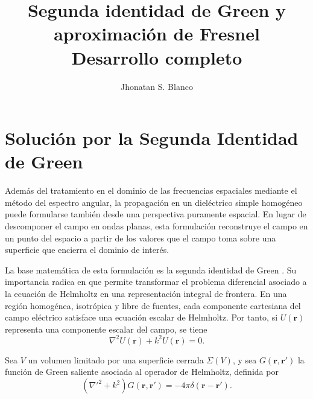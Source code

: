 \documentclass[12pt,a4paper]{article}
\title{Segunda identidad de Green y aproximación de Fresnel\\
\large Desarrollo completo}
\author{Jhonatan S. Blanco}
\date{}
\numberwithin{equation}{section}
\begin{document}
\maketitle
\tableofcontents

\section{Solución por la Segunda Identidad de Green}


Además del tratamiento en el dominio de las frecuencias espaciales mediante el método del espectro angular, la propagación en un dieléctrico simple homogéneo puede formularse también desde una perspectiva puramente espacial. En lugar de descomponer el campo en ondas planas, esta formulación reconstruye el campo en un punto del espacio a partir de los valores que el campo toma sobre una superficie que encierra el dominio de interés.

La base matemática de esta formulación es la segunda identidad de Green \cite{arfken2013}. Su importancia radica en que permite transformar el problema diferencial asociado a la ecuación de Helmholtz en una representación integral de frontera. En una región homogénea, isotrópica y libre de fuentes, cada componente cartesiana del campo eléctrico satisface una ecuación escalar de Helmholtz. Por tanto, si \(U(\mathbf r)\) representa una componente escalar del campo, se tiene
\begin{equation}
\nabla^2 U(\mathbf r)+k^2U(\mathbf r)=0.
\label{eq:scalar_Helmholtz_equation}
\end{equation}

Sea \(V\) un volumen limitado por una superficie cerrada \(\Sigma(V)\), y sea \(G(\mathbf r,\mathbf r')\) la función de Green saliente asociada al operador de Helmholtz, definida por
\begin{equation}
\left(\nabla'^2+k^2\right)G(\mathbf r,\mathbf r')
=
-4\pi\delta(\mathbf r-\mathbf r').
\label{eq:Green_function_Helmholtz}
\end{equation}
\end{document}
